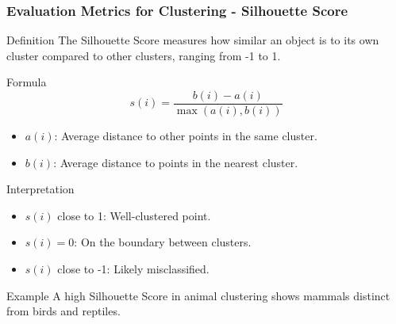 \documentclass[aspectratio=169]{beamer}
\begin{document}
\begin{frame}[fragile]
    \frametitle{Evaluation Metrics for Clustering - Silhouette Score}
    \begin{block}{Definition}
        The Silhouette Score measures how similar an object is to its own cluster compared to other clusters, ranging from -1 to 1.
    \end{block}

    \begin{block}{Formula}
        \begin{equation}
        s(i) = \frac{b(i) - a(i)}{\max(a(i), b(i))}
        \end{equation}
    \end{block}
    
    \begin{itemize}
        \item $a(i)$: Average distance to other points in the same cluster.
        \item $b(i)$: Average distance to points in the nearest cluster.
    \end{itemize}
    
    \begin{block}{Interpretation}
        \begin{itemize}
            \item $s(i)$ close to 1: Well-clustered point.
            \item $s(i)=0$: On the boundary between clusters.
            \item $s(i)$ close to -1: Likely misclassified.
        \end{itemize}
    \end{block}
    
    \begin{block}{Example}
        A high Silhouette Score in animal clustering shows mammals distinct from birds and reptiles.
    \end{block}
\end{frame}
\end{document}
